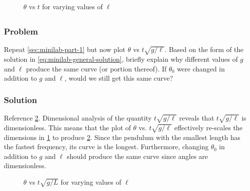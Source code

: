\documentclass[12pt]{article}
\begin{document}
  \begin{figure}
    \centering
    \caption{$\theta$ vs $t$ for varying values of $\ell$}
\label{fig:minilab-part-1-solution}
  \end{figure}

\subsection{}
\label{sec:minilab-part-2}
  \subsubsection*{Problem}
  Repeat \cref{sec:minilab-part-1} but now plot $\theta$ vs $t\sqrt{g/\ell}$.
  Based on the form of the solution in \cref{eq:minilab-general-solution},
  briefly explain why different values of $g$ and $\ell$ produce the same curve
  (or portion thereof). If $\theta_0$ were changed in addition to $g$ and
  $\ell$, would we still get this same curve?

  \subsubsection*{Solution}
  Reference \cref{fig:minilab-part-2-solution}. Dimensional analysis of the quantity
  $t\sqrt{g/\ell}$ reveals that $t\sqrt{g/\ell}$ is dimensionless. This means
  that the plot of $\theta$ vs. $t\sqrt{g/\ell}$ effectively re-scales the
  dimensions in \cref{fig:minilab-part-1-solution} to produce \cref{fig:minilab-part-2-solution}.
  Since the pendulum with the smallest length has the fastest frequency, its
  curve is the longest. Furthermore, changing $\theta_0$ in addition to $g$ and
  $\ell$ should produce the same curve since angles are dimensionless.

  \begin{figure}
    \centering
    \caption{$\theta$ vs $t\sqrt{g/L}$ for varying values of $\ell$}
\label{fig:minilab-part-2-solution}
  \end{figure}
\end{document}
